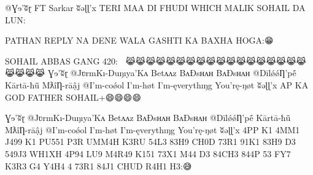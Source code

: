 @Ɣɘ'ʬɽ FT Sarkar ʬəɭɭ'x TERI MAA DI FHUDI WHICH MALIK SOHAIL DA LUN:🤧💪🏻

PATHAN REPLY NA DENE WALA GASHTI KA BAXHA HOGA:😁

SOHAIL ABBAS GANG 420:🤞🏻
😹😹😹😹😹😹😹😹😹😹😹😹😹😹😹😹😹😹😹😹😹😹
Ɣɘ'ʬɽ @JʋrmKı-Duŋıya'Kʌ Betʌʌz BʌÐsʜʌʜ BʌÐsʜʌʜ 
@DīlǿǿȠ'pḗ Kārtā-ħǖ MƛîȠ-rāậj 
@I'm-coǿol I'm-høt I'm-ęverythıŋg You'rę-ŋøt  ʬəɭɭ'x AP KA GOD FATHER SOHAIL+😄😄😄😄

Ɣɘ'ʬɽ @JʋrmKı-Duŋıya'Kʌ Betʌʌz BʌÐsʜʌʜ BʌÐsʜʌʜ 
@DīlǿǿȠ'pḗ Kārtā-ħǖ MƛîȠ-rāậj 
@I'm-coǿol I'm-høt I'm-ęverythıŋg You'rę-ŋøt  ʬəɭɭ'x  4PP K1 4MM1 J499 K1 PU551 P3R UMM4H K3RU 54L3 83H9 CH0D 73R1 91K1 83H9 D3 549J3 WH1XH 4P94 LU9 M4R49 K151 73X1 M44 D3 84CH3 844P 53 FY7 K3R3 G4 Y4H4 4 73R1 84J1 CHUD R4H1 H3:😅

